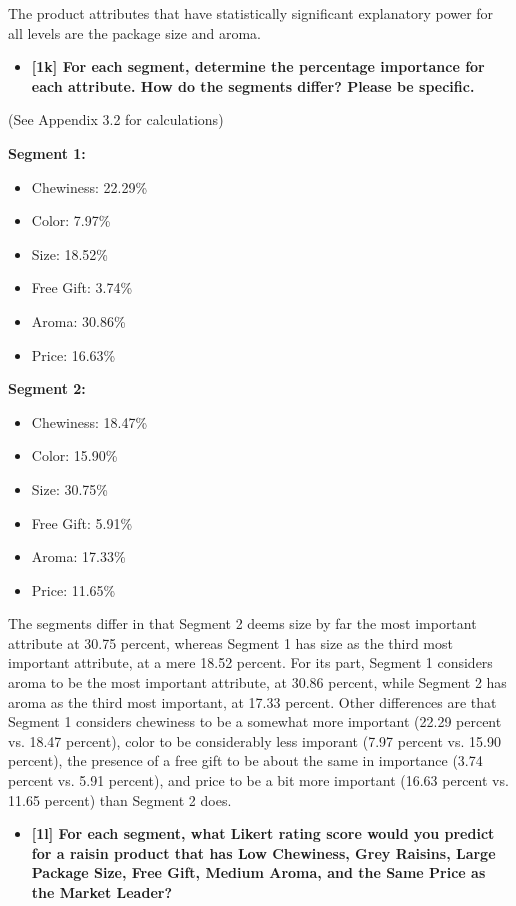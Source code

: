 \documentclass[10pt, oneside,spanish]{article}
\begin{document}
The product attributes that have statistically significant explanatory power for all levels are the package size and aroma.



\begin{itemize}
\item \textbf{[1k] For each segment, determine the percentage importance for each attribute.  How do the segments differ? Please be specific.     }
\end{itemize}

(See Appendix 3.2 for calculations)


\textbf{Segment 1:}
\begin{itemize}
\item Chewiness: 22.29\%
\item Color: 7.97\%
\item Size: 18.52\%
\item Free Gift: 3.74\%
\item Aroma: 30.86\%
\item Price: 16.63\%
\end{itemize}

\pagebreak

\textbf{Segment 2:}
\begin{itemize}
\item Chewiness: 18.47\%
\item Color: 15.90\%
\item Size: 30.75\%
\item Free Gift: 5.91\%
\item Aroma: 17.33\%
\item Price: 11.65\%
\end{itemize}

The segments differ in that Segment 2 deems size by far the most important attribute at 30.75 percent, whereas Segment 1 has size as the third most important attribute, at a mere 18.52 percent.  For its part, Segment 1 considers aroma to be the most important attribute, at 30.86 percent, while Segment 2 has aroma as the third most important, at 17.33 percent.  Other differences are that Segment 1 considers chewiness to be a somewhat more important (22.29 percent vs. 18.47 percent), color to be considerably less imporant (7.97 percent vs. 15.90 percent), the presence of a free gift to be about the same in importance (3.74 percent vs. 5.91 percent), and price to be a bit more important (16.63 percent vs. 11.65 percent) than Segment 2 does.   

\begin{itemize}
\item \textbf{[1l]   For each segment, what Likert  rating score would you predict for a raisin product that has Low Chewiness, Grey Raisins, Large Package Size, Free Gift, Medium Aroma, and the Same Price as the Market Leader?    }
\end{itemize}
\end{document}
